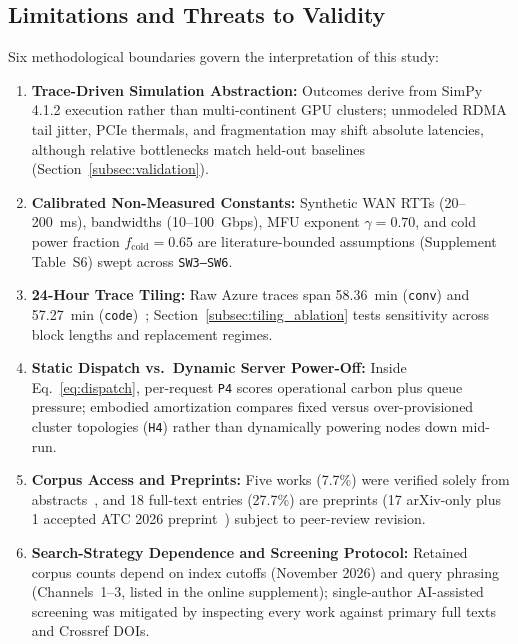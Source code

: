 \subsection{Limitations and Threats to Validity}\label{subsec:limitations}
Six methodological boundaries govern the interpretation of this study:
\begin{enumerate}
    \item \textbf{Trace-Driven Simulation Abstraction:} Outcomes derive from SimPy 4.1.2 execution rather than multi-continent GPU clusters; unmodeled RDMA tail jitter, PCIe thermals, and fragmentation may shift absolute latencies, although relative bottlenecks match held-out baselines (Section~\ref{subsec:validation}).
    \item \textbf{Calibrated Non-Measured Constants:} Synthetic WAN RTTs (20--200~ms), bandwidths (10--100~Gbps), MFU exponent $\gamma=0.70$, and cold power fraction $f_{\text{cold}}=0.65$ are literature-bounded assumptions (Supplement Table~S6) swept across \texttt{SW3--SW6}.
    \item \textbf{24-Hour Trace Tiling:} Raw Azure traces span 58.36~min (\texttt{conv}) and 57.27~min (\texttt{code})~\cite{azure2024trace}; Section~\ref{subsec:tiling_ablation} tests sensitivity across block lengths and replacement regimes.
    \item \textbf{Static Dispatch vs.\ Dynamic Server Power-Off:} Inside Eq.~\eqref{eq:dispatch}, per-request \texttt{P4} scores operational carbon plus queue pressure; embodied amortization compares fixed versus over-provisioned cluster topologies (\texttt{H4}) rather than dynamically powering nodes down mid-run.
    \item \textbf{Corpus Access and Preprints:} Five works (7.7\%) were verified solely from abstracts~\cite{roy2026lowcarb,calavaro2026offloading,gupta2022act,sinha2025utilization,calheiros2011cloudsim}, and 18 full-text entries (27.7\%) are preprints (17 arXiv-only plus 1 accepted ATC 2026 preprint~\cite{wang2026festina}) subject to peer-review revision.
    \item \textbf{Search-Strategy Dependence and Screening Protocol:} Retained corpus counts depend on index cutoffs (November 2026) and query phrasing (Channels~1--3, listed in the online supplement); single-author AI-assisted screening was mitigated by inspecting every work against primary full texts and Crossref DOIs.
\end{enumerate}
